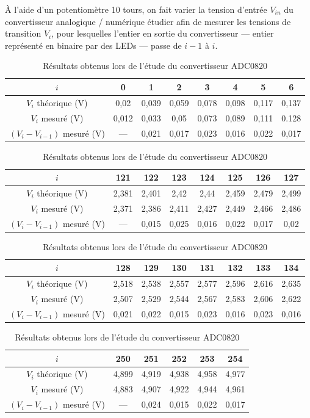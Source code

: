 \documentclass{article}
\begin{document}

À l'aide d'un potentiomètre 10 tours, on fait varier la tension d'entrée $V_{in}$ du convertisseur analogique / numérique étudier afin de mesurer les tensions de transition $V_i$, pour lesquelles l'entier en sortie du convertisseur --- entier représenté en binaire par des LEDs --- passe de $i-1$ à $i$.

\begin{table}[h]
\caption{Résultats obtenus lors de l'étude du convertisseur ADC0820}
\label{tab:ADC0820}
\centering
\begin{tabular}{|c|c|c|c|c|c|c|c|}
\hline
$i$             & 0 & 1 & 2 & 3 & 4 & 5 & 6\\
\hline
$V_i$ théorique (V) & 0,02 & 0,039 & 0,059 & 0,078 & 0,098 & 0,117 & 0,137 \\
\hline
$V_i$ mesuré (V)    & 0,012 & 0,033 & 0,05 & 0,073 & 0,089 & 0,111 & 0.128 \\
\hline
$(V_i-V_{i-1})$ mesuré (V) & --- & 0,021 & 0,017 & 0,023 & 0,016 & 0,022 & 0,017\\
\hline
\end{tabular}

\vspace{10pt}

\begin{tabular}{|c|c|c|c|c|c|c|c|}
\hline
$i$             & 121 & 122 & 123 & 124 & 125 & 126 & 127 \\
\hline
$V_i$ théorique (V) & 2,381 & 2,401 & 2,42 & 2,44 & 2,459 & 2,479 & 2,499 \\
\hline
$V_i$ mesuré (V)    & 2,371 & 2,386 & 2,411 & 2,427 & 2,449 & 2,466 & 2,486 \\
\hline
$(V_i-V_{i-1})$ mesuré (V) & --- & 0,015 & 0,025 & 0,016 & 0,022 & 0,017 & 0,02 \\
\hline
\end{tabular}

\begin{tabular}{|c|c|c|c|c|c|c|c|}
\hline
$i$             & 128 & 129 & 130 & 131 & 132 & 133 & 134 \\
\hline
$V_i$ théorique (V) & 2,518 & 2,538 & 2,557 & 2,577 & 2,596 & 2,616 & 2,635 \\
\hline
$V_i$ mesuré (V)    & 2,507 & 2,529 & 2,544 & 2,567 & 2,583 & 2,606 & 2,622 \\
\hline
$(V_i-V_{i-1})$ mesuré (V) & 0,021 & 0,022 & 0,015 & 0,023 & 0,016 & 0,023 & 0,016 \\
\hline
\end{tabular}

\vspace{10pt}

\begin{tabular}{|c|c|c|c|c|c|}
\hline
$i$             & 250 & 251 & 252 & 253 & 254 \\
\hline
$V_i$ théorique (V) & 4,899 & 4,919 & 4,938 & 4,958 & 4,977 \\
\hline
$V_i$ mesuré (V)    & 4,883 & 4,907 & 4,922 & 4,944 & 4,961 \\
\hline
$(V_i-V_{i-1})$ mesuré (V) & --- & 0,024 & 0,015 & 0,022 & 0,017 \\
\hline
\end{tabular}
\end{table}
\end{document}
